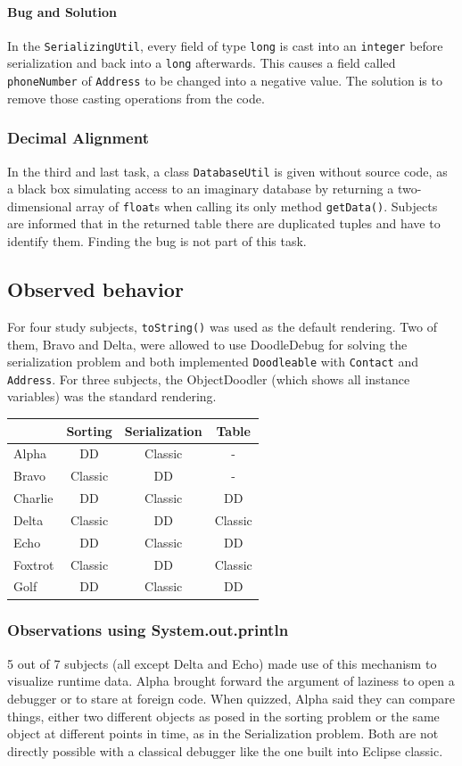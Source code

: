 \documentclass[english]{scrartcl}
\newcommand{\DD}{Dood\-le\-De\-bug\xspace}
\begin{document}
\paragraph{Bug and Solution}
In the \texttt{SerializingUtil}, every field of type \texttt{long} is cast %
into an \texttt{integer} before serialization and back into a \texttt{long} afterwards.
This causes a field called \texttt{phoneNumber} of \texttt{Address} to be changed into a negative value.
The solution is to remove those casting operations from the code.

\subsubsection{Decimal Alignment}
In the third and last task, a class \texttt{DatabaseUtil} is given without source code, as a black box simulating access to an imaginary database by returning a two-dimensional array of \texttt{float}s when calling its only method \texttt{getData()}.
Subjects are informed that in the returned table there are duplicated tuples and have to identify them.
Finding the bug is not part of this task.

\subsection{Observed behavior}
For four study subjects, \texttt{toString()} was used as the default rendering.
Two of them, Bravo and Delta, were allowed to use \DD for solving the serialization problem and both implemented \texttt{Doodleable} with \texttt{Contact} and \texttt{Address}.
For three subjects, the ObjectDoodler (which shows all instance variables) was the standard rendering.

\begin{tabular}{l | c c c}
\label{tool-usage-table}
 & \textbf{Sorting} & \textbf{Serialization} & \textbf{Table} \\
\hline
Alpha & DD & Classic & - \\
Bravo & Classic & DD & - \\
Charlie & DD & Classic & DD \\
Delta & Classic & DD & Classic \\
Echo & DD & Classic & DD \\
Foxtrot & Classic & DD & Classic \\
Golf & DD & Classic & DD \\
\end{tabular}

\subsubsection{Observations using System.out.println}
5 out of 7 subjects (all except Delta and Echo) made use of this mechanism to visualize runtime data.
Alpha brought forward the argument of laziness to open a debugger or to stare at foreign code.
When quizzed, Alpha said they can compare things, either two different objects as posed in the sorting problem or the same object at different points in time, as in the Serialization problem.
Both are not directly possible with a classical debugger like the one built into Eclipse classic.
\end{document}
